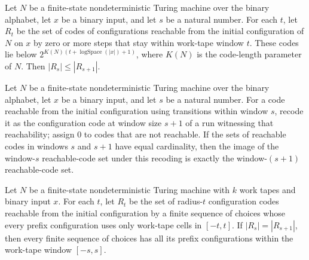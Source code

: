 \begin{theorem}
\label{Complexity.ExpBFS.card_rset_le_succ}
\leanok
{}
Let $N$ be a finite-state nondeterministic Turing machine over the binary alphabet, let
$x$ be a binary input, and let $s$ be a natural number. For each $t$, let $R_t$ be the
set of codes of configurations reachable from the initial configuration of $N$ on $x$
by zero or more steps that stay within work-tape window $t$. These codes lie below
$2^{K(N)(t+\operatorname{logSpace}(|x|)+1)}$, where $K(N)$ is the code-length parameter
of $N$. Then $|R_s|\le |R_{s+1}|$.
\end{theorem}

\begin{lemma}
\label{Complexity.ExpBFS.image_recode_of_card_eq}
\leanok
{}
Let $N$ be a finite-state nondeterministic Turing machine over the binary alphabet, let
$x$ be a binary input, and let $s$ be a natural number. For a code reachable from the
initial configuration using transitions within window $s$, recode it as the
configuration code at window size $s+1$ of a run witnessing that reachability; assign
$0$ to codes that are not reachable. If the sets of reachable codes in windows $s$ and
$s+1$ have equal cardinality, then the image of the window-$s$ reachable-code set under
this recoding is exactly the window-$(s+1)$ reachable-code set.
\end{lemma}

\begin{theorem}
\label{Complexity.ExpBFS.winRun_of_card_eq}
\leanok
{}
Let $N$ be a finite-state nondeterministic Turing machine with $k$ work tapes and binary
input $x$. For each $t$, let $R_t$ be the set of radius-$t$ configuration codes
reachable from the initial configuration by a finite sequence of choices whose every
prefix configuration uses only work-tape cells in $[-t,t]$. If $|R_s|=|R_{s+1}|$,
then every finite sequence of choices has all its prefix configurations within the
work-tape window $[-s,s]$.
\end{theorem}

